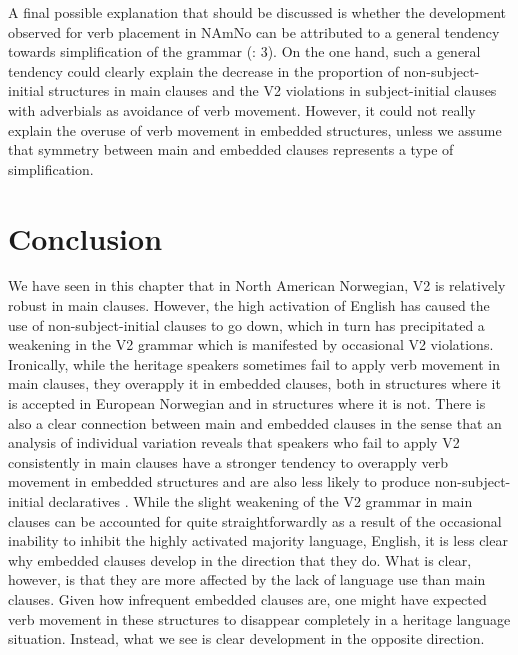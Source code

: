 \documentclass[output=paper]{langscibook}
\begin{document}
A final possible explanation that should be discussed is whether the development observed for verb placement in NAmNo can be attributed to a general tendency towards simplification of the grammar (\citealt{ScontrasEtAl2015}: 3). On the one hand, such a general tendency could clearly explain the decrease in the proportion of non\hyp subject\hyp initial structures in main clauses and the V2 violations in subject\hyp initial clauses with adverbials as avoidance of verb movement. However, it could not really explain the overuse of verb movement in embedded structures, unless we assume that symmetry between main and embedded clauses represents a type of simplification. 

\section{Conclusion}
\label{sec:anderssen:6}

We have seen in this chapter that in North American Norwegian, V2 is relatively robust in main clauses. However, the high activation of English has caused the use of non\hyp subject\hyp initial clauses to go down, which in turn has precipitated a weakening in the V2 grammar which is manifested by occasional V2 violations. Ironically, while the heritage speakers sometimes fail to apply verb movement in main clauses, they overapply it in embedded clauses, both in structures where it is accepted in European Norwegian and in structures where it is not. There is also a clear connection between main and embedded clauses in the sense that an analysis of individual variation reveals that speakers who fail to apply V2 consistently in main clauses have a stronger tendency to overapply verb movement in embedded structures and are also less likely to produce non\hyp subject\hyp initial declaratives \citep{JensbergEtAl2024}. While the slight weakening of the V2 grammar in main clauses can be accounted for quite straightforwardly as a result of the occasional inability to inhibit the highly activated majority language, English, it is less clear why embedded clauses develop in the direction that they do. What is clear, however, is that they are more affected by the lack of language use than main clauses. Given how infrequent embedded clauses are, one might have expected verb movement in these structures to disappear completely in a heritage language situation. Instead, what we see is clear development in the opposite direction. 
\end{document}
